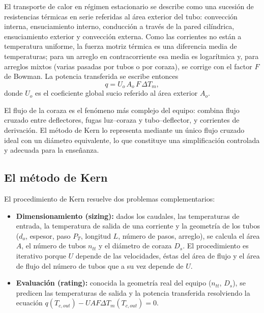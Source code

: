 \documentclass[11pt,a4paper]{article}
\begin{document}
El transporte de calor en r\'egimen estacionario se describe como una
sucesi\'on de resistencias t\'ermicas en serie referidas al \'area exterior del
tubo:
convecci\'on interna, ensuciamiento interno, conducci\'on a trav\'es de la pared
cil\'indrica, ensuciamiento exterior y convecci\'on externa. Como las
corrientes no est\'an a temperatura uniforme, la fuerza motriz t\'ermica es una
diferencia media de temperaturas; para un arreglo en contracorriente esa media
es logar\'itmica y, para arreglos mixtos (varias pasadas por tubos o por
coraza), se corrige con el factor $F$ de Bowman. La potencia transferida se
escribe entonces
\begin{equation}
q = U_o \, A_o \, F \, \Delta T_m ,
\label{eq:q}
\end{equation}
donde $U_o$ es el coeficiente global sucio referido al \'area exterior $A_o$.

El flujo de la coraza es el fen\'omeno m\'as complejo del equipo: combina
flujo cruzado entre deflectores, fugas luz--coraza y tubo--deflector, y
corrientes de derivaci\'on. El m\'etodo de Kern lo representa mediante un
\'unico flujo cruzado ideal con un di\'ametro equivalente, lo que constituye
una simplificaci\'on controlada y adecuada para la ense\~nanza.

\subsection{El m\'etodo de Kern}

El procedimiento de Kern \cite{kern} resuelve dos problemas complementarios:

\begin{itemize}[leftmargin=1.4em]
\item \textbf{Dimensionamiento (sizing):} dados los caudales, las temperaturas
de entrada, la temperatura de salida de una corriente y la geometr\'ia de los
tubos ($d_o$, espesor, paso $P_T$, longitud $L$, n\'umero de pasos, arreglo),
se calcula el \'area $A$, el n\'umero de tubos $n_{tt}$ y el di\'ametro de
coraza $D_s$. El procedimiento es iterativo porque $U$ depende de las
velocidades, \'estas del \'area de flujo y el \'area de flujo del n\'umero de
tubos que a su vez depende de $U$.
\item \textbf{Evaluaci\'on (rating):} conocida la geometr\'ia real del equipo
($n_{tt}$, $D_s$), se predicen las temperaturas de salida y la potencia
transferida resolviendo la ecuaci\'on $q(T_{c,out}) - U A F \Delta T_m(T_{c,out}) = 0$.
\end{itemize}
\end{document}
